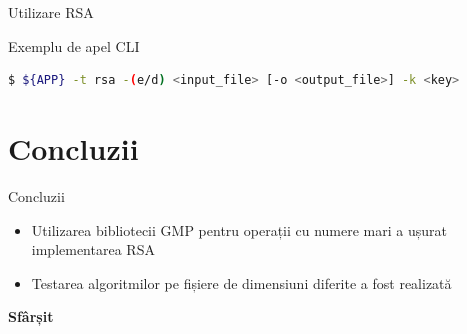 \documentclass{beamer}
\begin{document}
\begin{frame}[fragile]{Utilizare RSA}
  \begin{block}{Exemplu de apel CLI}
    \begin{lstlisting}[language=bash]
$ ${APP} -t rsa -(e/d) <input_file> [-o <output_file>] -k <key>
    \end{lstlisting}
  \end{block}
\end{frame}

\section{Concluzii}

\begin{frame}{Concluzii}
  \begin{itemize}
    \item Utilizarea bibliotecii GMP pentru operații cu numere mari a ușurat implementarea RSA
    \item Testarea algoritmilor pe fișiere de dimensiuni diferite a fost realizată
  \end{itemize}
\end{frame}

\begin{frame}[plain]
  \centering
  \Huge\bfseries
  \textcolor{myblue}{Sfârșit}
\end{frame}
\end{document}
